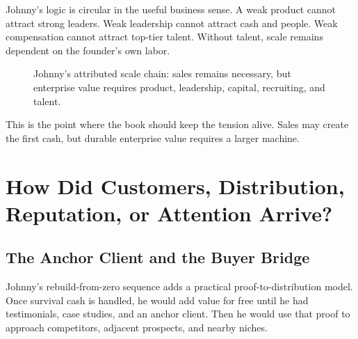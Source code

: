 \documentclass[11pt,oneside]{book}
\begin{document}
Johnny's logic is circular in the useful business sense. A weak product cannot attract strong leaders. Weak leadership cannot attract cash and people. Weak compensation cannot attract top-tier talent. Without talent, scale remains dependent on the founder's own labor.

\begin{figure}
\centering
{}
\caption{Johnny's attributed scale chain: sales remains necessary, but enterprise value requires product, leadership, capital, recruiting, and talent.}
\end{figure}

This is the point where the book should keep the tension alive. Sales may create the first cash, but durable enterprise value requires a larger machine.

\chapter{How Did Customers, Distribution, Reputation, or Attention Arrive?}

\section{The Anchor Client and the Buyer Bridge}

Johnny's rebuild-from-zero sequence adds a practical proof-to-distribution model. Once survival cash is handled, he would add value for free until he had testimonials, case studies, and an anchor client. Then he would use that proof to approach competitors, adjacent prospects, and nearby niches.
\end{document}
